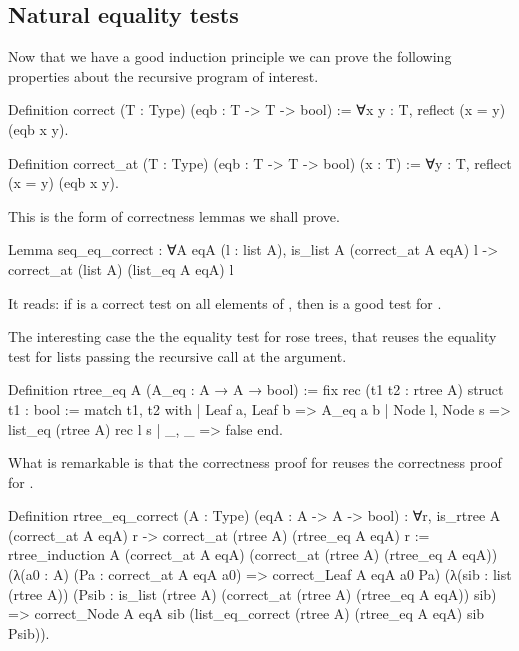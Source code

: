 \documentclass[a4paper, 11pt]{book}
\begin{document}
\subsection{Natural equality tests}

Now that we have a good induction principle we can prove the following
properties about the recursive program of interest.

\begin{rocqcode}
Definition correct (T : Type) (eqb : T -> T -> bool) :=
  ∀x y : T, reflect (x = y) (eqb x y).

Definition correct_at (T : Type) (eqb : T -> T -> bool) (x : T) :=
  ∀y : T, reflect (x = y) (eqb x y).
\end{rocqcode}

This is the form of correctness lemmas we shall prove.

\begin{rocqcode}
Lemma seq_eq_correct : ∀A eqA (l : list A),
  is_list A (correct_at A eqA) l ->
    correct_at (list A) (list_eq A eqA) l
\end{rocqcode}

It reads: if  is a correct test on all elements of ,
then  is a good test for .

The interesting case the the equality test for rose trees, that reuses
the equality test for lists  passing the recursive call
at the  argument.

\begin{rocqcode}
Definition rtree_eq A (A_eq : A → A → bool) :=
  fix rec (t1 t2 : rtree A) {struct t1} : bool :=
    match t1, t2 with
    | Leaf a, Leaf b => A_eq a b
    | Node l, Node s => list_eq (rtree A) rec l s
    | _, _ => false
    end.
\end{rocqcode}

What is remarkable is that the correctness proof for 
reuses the correctness proof for .

\begin{rocqcode}
Definition rtree_eq_correct (A : Type) (eqA : A -> A -> bool) :
  ∀r, is_rtree A (correct_at A eqA) r ->
        correct_at (rtree A) (rtree_eq A eqA) r
:=
  rtree_induction
    A (correct_at A eqA) (correct_at (rtree A) (rtree_eq A eqA))
    (λ(a0 : A) (Pa : correct_at A eqA a0) =>
       correct_Leaf A eqA a0 Pa)
    (λ(sib : list (rtree A))
         (Psib : is_list (rtree A)
                   (correct_at (rtree A) (rtree_eq A eqA)) sib) =>
       correct_Node A eqA sib
         (list_eq_correct (rtree A) (rtree_eq A eqA) sib Psib)).
\end{rocqcode}
\end{document}
